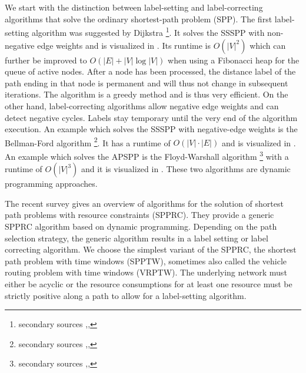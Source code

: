 \section{}
We start with the distinction between label-setting \cite[ch. 4]{ahuja1993network} and label-correcting \cite[ch. 5]{ahuja1993network} algorithms that solve the ordinary shortest-path problem (SPP).
The first label-setting algorithm was suggested by Dijkstra \cite{dijkstra1959note}\footnote{secondary sources \cite[sec. 4.5]{ahuja1993network},\cite[sec. 24.3]{cormen2009introduction},\cite[sec. 3.7, p. 83]{jungnickel2013graphs}}. It solves the SSSPP with non-negative edge weights and is visualized in \cite{velden2014idp}. Its runtime is $O(|V|^2)$ which can further be improved to $O(|E| + |V| \log |V|)$ when using a Fibonacci heap for the queue of active nodes. After a node has been processed, the distance label of the path ending in that node is permanent and will thus not change in subsequent iterations. The algorithm is a greedy method and is thus very efficient.
On the other hand, label-correcting algorithms allow negative edge weights and can detect negative cycles. Labels stay temporary until the very end of the algorithm execution. An example which solves the SSSPP with negative-edge weights is the Bellman-Ford algorithm \cite{bellman1958routing,ford1962flows}\footnote{secondary sources \cite[sec. 5.4]{ahuja1993network},\cite[sec. 24.1]{cormen2009introduction},\cite[sec. 3.7, p. 87]{jungnickel2013graphs}}. It has a runtime of $O(|V|\cdot|E|)$ and is visualized in \cite{storz2013idp}. An example which solves the APSPP is the Floyd-Warshall algorithm \cite{floyd1962algorithm,warshall1962theorem}\footnote{secondary sources \cite[sec. 5.6]{ahuja1993network},\cite[sec. 25.2]{cormen2009introduction},\cite[sec. 3.9]{jungnickel2013graphs}} with a runtime of $O(|V|^3)$ and it is visualized in \cite{becker2015idp}. These two algorithms are dynamic programming approaches. 


The recent survey \cite{irnich2005shortest} gives an overview of algorithms for the solution of shortest path problems with resource constraints (SPPRC).%
They provide a generic SPPRC algorithm based on dynamic programming. Depending on the path selection strategy, the generic algorithm results in a label setting or label correcting algorithm. We choose the simplest variant of the SPPRC, the shortest path problem with time windows (SPPTW), sometimes also called the vehicle routing problem with time windows (VRPTW). The underlying network must either be acyclic or the resource consumptions for at least one resource must be strictly positive along a path to allow for a label-setting algorithm. 

